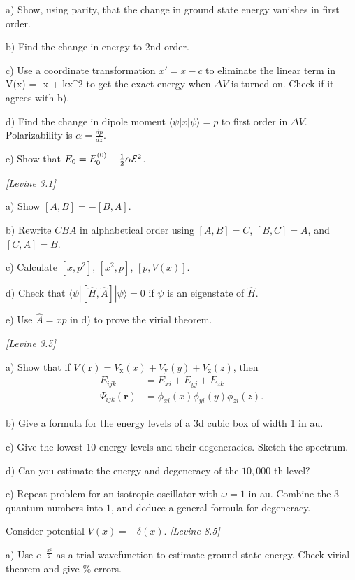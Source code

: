 a) Show, using parity, that the change in ground state energy vanishes in first order.

b) Find the change in energy to 2nd order.

c) Use a coordinate transformation $x' = x - c$ to eliminate the linear term in
\be
   V(x) = -\cE x + kx^2
\ee
to get the exact energy when $\Delta V$ is turned on. Check if it agrees with b).

d) Find the change in dipole moment $\langle\psi|x|\psi\rangle = p$ to first order in
$\Delta V$. Polarizability is $\alpha = \frac{dp}{dz}$.

e) Show that $E_0 = E_0^{(0)} - \frac{1}{2}\alpha {\cal E}^2$.

\newpage
{}
{\em [Levine 3.1]}

a) Show $[A,B] = -[B,A]$.

b) Rewrite $CBA$ in alphabetical order using $[A,B] = C$, $[B,C]=A$, and $[C,A]=B$.

c) Calculate $[x,p^2]$, $[x^2,p]$, $[p,V(x)]$.

d) Check that $\langle\psi|[\hat{H},\hat{A}]|\psi\rangle = 0$ if
$\psi$ is an eigenstate of $\hat{H}$.

e) Use $\hat{A} = xp$ in d) to prove the virial theorem.

\newpage
{}
{\em [Levine 3.5]}

a) Show that if $V(\mathbf{r}) = V_{\text{x}}(x) + V_{\text{y}}(y) + V_{\text{z}}(z)$, then
\begin{align*}
   E_{ijk} & = E_{xi} + E_{yj} + E_{zk} \\
   \Psi_{ijk}(\mathbf{r}) & = \phi_{xi}(x)\phi_{yi}(y)\phi_{zi}(z).
\end{align*}  

b) Give a formula for the energy levels of a 3d cubic box of width 1 in au.

c) Give the lowest 10 energy levels and their degeneracies. Sketch the spectrum.

d) Can you estimate the energy and degeneracy of the $10,000$-th level?

e) Repeat problem for an isotropic oscillator with $\omega=1$ in au. Combine the $3$
quantum numbers into $1$, and deduce a general formula for degeneracy.

\newpage
{}
Consider potential $V(x) = -\delta(x)$.
{\em [Levine 8.5]}

a) Use $e^{-\frac{x^2}{2}}$ as a trial wavefunction to estimate ground state energy.
Check virial theorem and give $\%$ errors.

